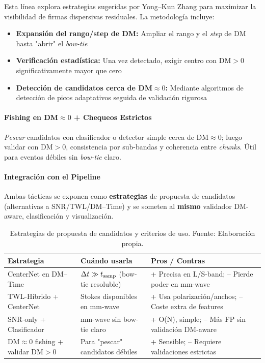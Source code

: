Esta línea explora estrategias sugeridas por Yong–Kun Zhang \cite{zhang2024drafts} para maximizar la visibilidad de firmas dispersivas residuales. La metodología incluye:

\begin{itemize}
\item \textbf{Expansión del rango/step de DM:} Ampliar el rango y el \textit{step} de DM hasta "abrir" el \textit{bow-tie}
\item \textbf{Verificación estadística:} Una vez detectado, exigir centro con DM$>0$ significativamente mayor que cero
\item \textbf{Detección de candidatos cerca de DM$\approx 0$:} Mediante algoritmos de detección de picos adaptativos seguida de validación rigurosa
\end{itemize}

\paragraph{Fishing en DM$\approx 0$ + Chequeos Estrictos}

\textit{Pescar} candidatos con clasificador o detector simple cerca de DM$\approx 0$; luego validar con DM$>0$, consistencia por sub-bandas y coherencia entre \emph{chunks}. Útil para eventos débiles sin \textit{bow-tie} claro.

\paragraph{Integración con el Pipeline}

Ambas tácticas se exponen como \textbf{estrategias} de propuesta de candidatos (alternativas a SNR/TWL/DM--Time) y se someten al \textbf{mismo} validador DM-aware, clasificación y visualización.

\begin{table}[H] 
\centering 
  \caption{Estrategias de propuesta de candidatos y criterios de uso. Fuente: Elaboración propia.}
  \label{tab:estrategias}
\begin{tabular}{|l|l|l|} 
\toprule 
\textbf{Estrategia} & \textbf{Cuándo usarla} & \textbf{Pros / Contras} \\ 
\midrule 
CenterNet en DM--Time & $\Delta t \gg t_{\rm samp}$ (bow-tie resoluble) & + Precisa en L/S-band; -- Pierde poder en mm-wave \\ 
TWL-Híbrido + CenterNet & Stokes disponibles en mm-wave & + Usa polarización/anchos; -- Coste extra de features \\ 
SNR-only + Clasificador & mm-wave sin bow-tie claro & + O(N), simple; -- Más FP sin validación DM-aware \\ 
DM$\approx 0$ fishing + validar DM$>0$ & Para "pescar" candidatos débiles & + Sensible; -- Requiere validaciones estrictas \\ 
\bottomrule 
\end{tabular} 
\end{table}

